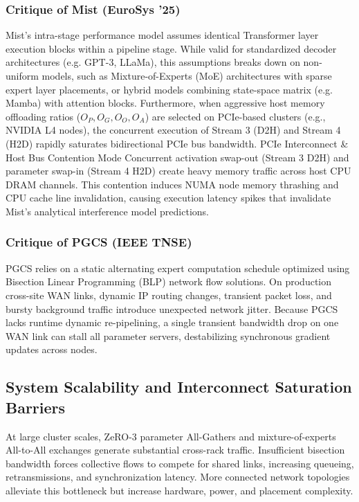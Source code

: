 \documentclass[11pt,journal,final, onecolumn]{IEEEtran}
\begin{document}
\subsubsection{Critique of Mist (EuroSys ’25)}
Mist's intra-stage performance model assumes identical Transformer layer execution blocks within a pipeline stage. While valid for standardized decoder architectures (e.g. GPT-3, LLaMa), this assumptions breaks down on non-uniform models, such as Mixture-of-Experts (MoE) architectures with sparse expert layer placements, or hybrid models combining state-space matrix (e.g. Mamba) with attention blocks. Furthermore, when aggressive host memory offloading ratios ($O_P, O_G, O_O, O_A$) are selected on PCIe-based clusters (e.g., NVIDIA L4 nodes), the concurrent execution of Stream 3 (D2H) and Stream 4 (H2D) rapidly saturates bidirectional PCIe bus bandwidth.
PCIe Interconnect \& Host Bus Contention Mode Concurrent activation swap-out (Stream 3 D2H) and parameter swap-in (Stream 4 H2D) create heavy memory traffic across host CPU DRAM channels. This contention induces NUMA node memory thrashing and CPU cache line invalidation, causing execution latency spikes that invalidate Mist's analytical interference model predictions.

\subsubsection{Critique of PGCS (IEEE TNSE)}
PGCS relies on a static alternating expert computation schedule optimized using Bisection Linear Programming (BLP) network flow solutions. On production cross-site WAN links, dynamic IP routing changes, transient packet loss, and bursty background traffic introduce unexpected network jitter. Because PGCS lacks runtime dynamic re-pipelining, a single transient bandwidth drop on one WAN link can stall all parameter servers, destabilizing synchronous gradient updates across nodes.

\subsection{System Scalability and Interconnect Saturation Barriers}
\label{subsec:scalability-barriers}

At large cluster scales, ZeRO-3 parameter All-Gathers and mixture-of-experts
All-to-All exchanges generate substantial cross-rack traffic. Insufficient
bisection bandwidth forces collective flows to compete for shared links,
increasing queueing, retransmissions, and synchronization latency. More
connected network topologies alleviate this bottleneck but increase hardware,
power, and placement complexity.
\end{document}
